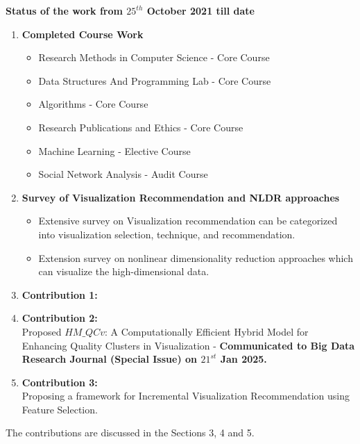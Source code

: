 



\Large{\textbf{Status of the work from $25^{th}$ October 2021 till date}}
\begin{enumerate}
    \item \large{\textbf{Completed Course Work}}
    \begin{itemize}
        \item Research Methods in Computer Science - Core Course 
        \item Data Structures And Programming Lab - Core Course
        \item Algorithms - Core Course
        \item Research Publications and Ethics - Core Course
        \item Machine Learning - Elective Course
        \item Social Network Analysis - Audit Course
    \end{itemize}
    \item \large{\textbf{Survey of Visualization Recommendation and NLDR approaches}}
    \begin{itemize}
        \item Extensive survey on Visualization recommendation  can be categorized into visualization selection, technique, and recommendation.
        \item Extension survey on nonlinear dimensionality reduction approaches which can visualize the high-dimensional data.
    \end{itemize}
    
    \item \large{\textbf{Contribution 1:}}\\
    
    \item \large{\textbf{Contribution 2:}}\\
    Proposed $HM\_QCv$: A Computationally Efficient Hybrid Model for Enhancing Quality Clusters in Visualization - \textbf{Communicated to Big Data Research Journal (Special Issue) on $21^{st}$ Jan 2025.}
    \item \large{\textbf{Contribution 3:}}\\
    Proposing a framework for Incremental Visualization Recommendation using Feature Selection.
\end{enumerate}


The contributions are discussed in the Sections 3, 4 and 5.